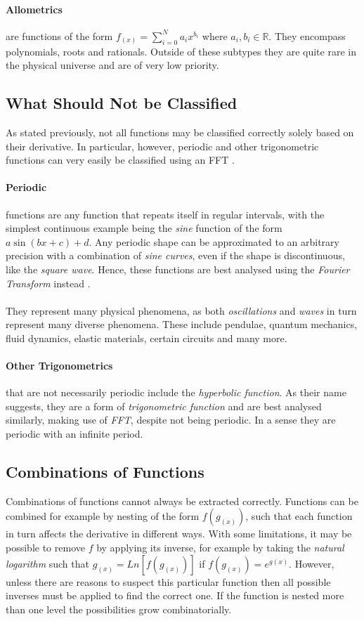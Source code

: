 \documentclass[main.tex]{subfiles}
\begin{document}
      \paragraph{Allometrics} are functions of the form $f_{(x)}=\sum_{i=0}^{N} a_i x^{b_i} $ where $a_i,b_i \in \mathbb{R}$. They encompass polynomials, roots and rationals. Outside of these subtypes they are quite rare in the physical universe and are of very low priority.
    
    \subsection{What Should Not be Classified}
      
      As stated previously, not all functions may be classified correctly solely based on their derivative. In particular, however, periodic and other trigonometric functions can very easily be classified using an FFT \cite{}.
      \paragraph{Periodic} functions are any function that repeats itself in regular intervals, with the simplest continuous example being the \textit{sine} function of the form $a \sin(b x + c) + d$. Any periodic shape can be approximated to an arbitrary precision with a combination of \textit{sine curves}, even if the shape is discontinuous, like the \textit{square wave}. Hence, these functions are best analysed using the \textit{Fourier Transform} instead \cite{}.
      \\\\
      They represent many physical phenomena, as both \textit{oscillations} and \textit{waves} in turn represent many diverse phenomena. These include pendulae, quantum mechanics, fluid dynamics, elastic materials, certain circuits and many more.
      \paragraph{Other Trigonometrics} that are not necessarily periodic include the \textit{hyperbolic function}. As their name suggests, they are a form of \textit{trigonometric function} and are best analysed similarly, making use of \textit{FFT}, despite not being periodic. In a sense they are periodic with an infinite period. 
    
    \subsection{Combinations of Functions}
      Combinations of functions cannot always be extracted correctly. Functions can be combined for example by nesting of the form $f(g_{(x)})$, such that each function in turn affects the derivative in different ways. With some limitations, it may be possible to remove $f$ by applying its inverse, for example by taking the \textit{natural logarithm} such that $g_{(x)}=Ln\left [ f(g_{(x)})\right ]$ if $f(g_{(x)}) = e^{g(x)}$. However, unless there are reasons to suspect this particular function then all possible inverses must be applied to find the correct one. If the function is nested more than one level the possibilities grow combinatorially. 
      
\end{document}

